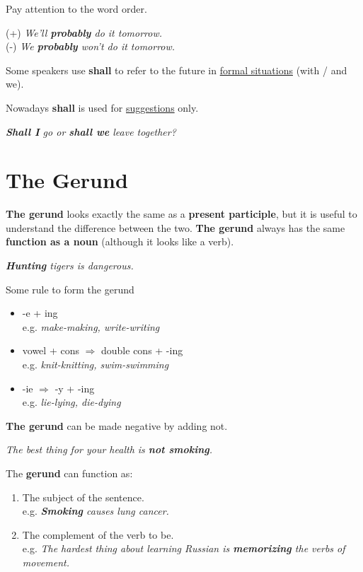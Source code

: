 \documentclass[hidelinks,10pt,a4paper]{article}
\begin{document}
Pay attention to the word order.

\begin{center}
	(+) \textit{We'll \textbf{probably} do it tomorrow.} \\
	(-) \textit{We \textbf{probably} won't do it tomorrow.}
\end{center}

Some speakers use \textbf{shall} to refer to the future in \underline{formal situations} (with / and we).

Nowadays \textbf{shall} is used for \underline{suggestions} only.

\begin{center}
	\textit{ \textbf{Shall I} go or \textbf{shall we} leave together? }
\end{center}

\section{The Gerund}
\textbf{The gerund}  looks exactly the same as a \textbf{present participle}, but it is useful to understand the difference between the two. \textbf{The gerund} always has the same \textbf{function as a noun} (although it looks like a verb).

\begin{center}
	\textit{ \textbf{Hunting} tigers is dangerous.}
\end{center}

Some rule to form the gerund
\begin{itemize}
	\item -e + ing \\
		e.g. \textit{make-making, write-writing}
	\item vowel + cons $\Rightarrow$ double cons + -ing \\
		e.g. \textit{knit-knitting, swim-swimming}
	\item -ie $\Rightarrow$ -y + -ing \\
		e.g. \textit{lie-lying, die-dying}
\end{itemize}

\textbf{The gerund} can be made negative by adding not.

\begin{center}
	\textit{The best thing for your health is \textbf{not smoking}. }
\end{center}

The \textbf{gerund} can function as:

\begin{enumerate}[label=(\alph*)]
	\item The subject of the sentence. \\
		e.g. \textit{ \textbf{Smoking} causes lung cancer.}
	\item The complement of the verb to be. \\
		e.g. \textit{The hardest thing about learning Russian is \textbf{memorizing} the verbs of movement. }
\end{enumerate}
\end{document}
